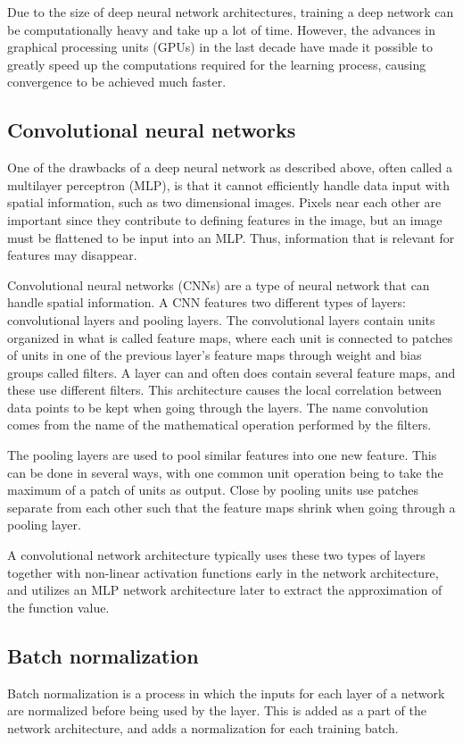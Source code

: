 \documentclass{kththesis}
\begin{document}
Due to the size of deep neural network architectures, training a deep network can be computationally heavy and take up a lot of time. However, the advances in graphical processing units (GPUs) in the last decade have made it possible to greatly speed up the computations required for the learning process, causing convergence to be achieved much faster. \parencite{lecun2015deep}

\subsection{Convolutional neural networks}
One of the drawbacks of a deep neural network as described above, often called a multilayer perceptron (MLP), is that it cannot efficiently handle data input with spatial information, such as two dimensional images. Pixels near each other are important since they contribute to defining features in the image, but an image must be flattened to be input into an MLP. Thus, information that is relevant for features may disappear. 

Convolutional neural networks (CNNs) are a type of neural network that can handle spatial information. A CNN features two different types of layers: convolutional layers and pooling layers. The convolutional layers contain units organized in what is called feature maps, where each unit is connected to patches of units in one of the previous layer's feature maps through weight and bias groups called filters. A layer can and often does contain several feature maps, and these use different filters. This architecture causes the local correlation between data points to be kept when going through the layers. The name convolution comes from the name of the mathematical operation performed by the filters. \parencite{lecun2015deep}

The pooling layers are used to pool similar features into one new feature. This can be done in several ways, with one common unit operation being to take the maximum of a patch of units as output. Close by pooling units use patches separate from each other such that the feature maps shrink when going through a pooling layer. \parencite{lecun2015deep}

A convolutional network architecture typically uses these two types of layers together with non-linear activation functions early in the network architecture, and utilizes an MLP network architecture later to extract the approximation of the function value. \parencite{lecun2015deep}

\subsection{Batch normalization}
Batch normalization is a process in which the inputs for each layer of a network are normalized before being used by the layer. This is added as a part of the network architecture, and adds a normalization for each training batch.
\end{document}

